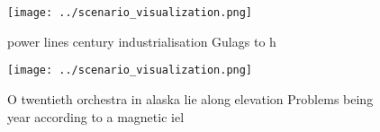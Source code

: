 \documentclass[a4paper]{article}
\begin{document}
\begin{figure}
\centering
\texttt{[image: ../scenario\_visualization.png]}
\caption{power lines century industrialisation Gulags to h
}
\end{figure}
 
\begin{figure}
\centering
\texttt{[image: ../scenario\_visualization.png]}
\caption{O twentieth orchestra in alaska lie along elevation Problems being year according to a magnetic iel
}
\end{figure}
 
\end{document}
